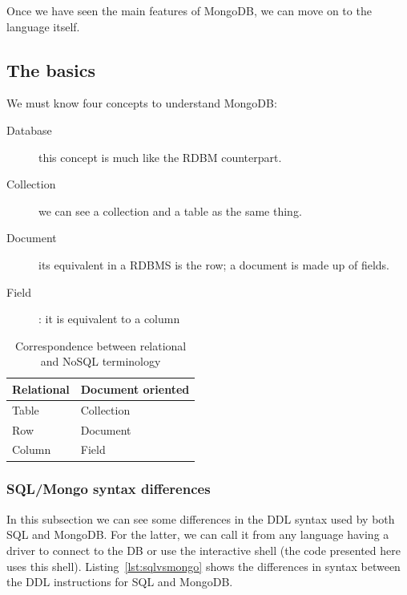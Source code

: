 Once we have seen the main features of MongoDB, we can move on to the language itself.

\subsection{The basics}

We must know four concepts to understand MongoDB:

\begin{description} %
\item[Database] this concept is much like the RDBM counterpart.
\item[Collection] we can see a collection and a table as the same thing.
\item[Document] its equivalent in
a RDBMS %
is the 
row; %
a document is made up of fields.
\item[Field]: it is equivalent to a column %
\end{description} %


\begin{table}
\begin{center}
\begin{tabular}{ll} %
\textbf{Relational} & \textbf{Document oriented} \\ \midrule[2pt]
Table & Collection\\ \midrule %
Row & Document\\ \midrule %
Column & Field \\
\end{tabular}
\end{center}
\caption{Correspondence between relational and NoSQL terminology}
\label{tab:relationalvsdocument}
\end{table}





\subsubsection{SQL/Mongo syntax differences}

In this subsection we can see some differences in the DDL syntax used by both SQL and MongoDB. For the latter, we can call it from any language having a driver to connect to the DB or use the interactive shell (the code presented here uses this shell). Listing~\ref{lst:sqlvsmongo} shows the differences in syntax between the DDL instructions for SQL and MongoDB.

